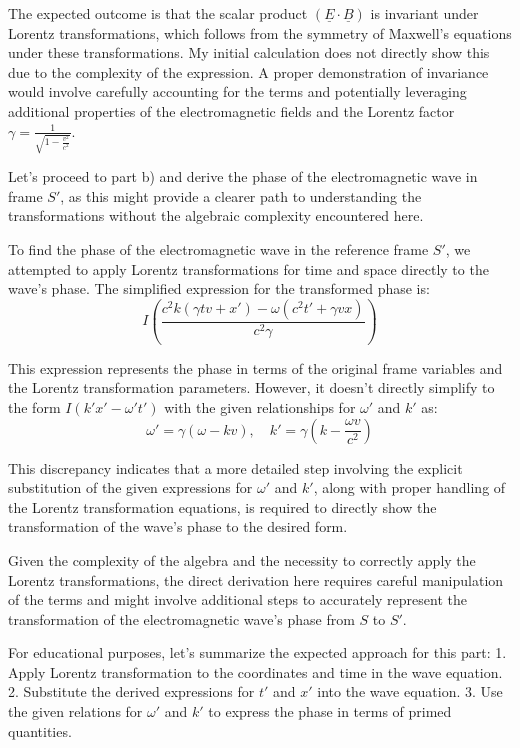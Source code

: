 The expected outcome is that the scalar product \( (\underline{E} \cdot \underline{B}) \) is invariant under Lorentz transformations, which follows from the symmetry of Maxwell's equations under these transformations. My initial calculation does not directly show this due to the complexity of the expression. A proper demonstration of invariance would involve carefully accounting for the terms and potentially leveraging additional properties of the electromagnetic fields and the Lorentz factor \( \gamma = \frac{1}{\sqrt{1 - \frac{v^2}{c^2}}} \).

Let's proceed to part b) and derive the phase of the electromagnetic wave in frame \( S' \), as this might provide a clearer path to understanding the transformations without the algebraic complexity encountered here.

To find the phase of the electromagnetic wave in the reference frame \( S' \), we attempted to apply Lorentz transformations for time and space directly to the wave's phase. The simplified expression for the transformed phase is:
\[ I \left( \frac{c^2 k (\gamma t v + x') - \omega (c^2 t' + \gamma v x)}{c^2 \gamma} \right) \]

This expression represents the phase in terms of the original frame variables and the Lorentz transformation parameters. However, it doesn't directly simplify to the form \( I(k'x' - \omega' t') \) with the given relationships for \(\omega'\) and \(k'\) as:
\[ \omega' = \gamma(\omega - kv), \quad k' = \gamma \left(k - \frac{\omega v}{c^{2}} \right) \]

This discrepancy indicates that a more detailed step involving the explicit substitution of the given expressions for \(\omega'\) and \(k'\), along with proper handling of the Lorentz transformation equations, is required to directly show the transformation of the wave's phase to the desired form.

Given the complexity of the algebra and the necessity to correctly apply the Lorentz transformations, the direct derivation here requires careful manipulation of the terms and might involve additional steps to accurately represent the transformation of the electromagnetic wave's phase from \( S \) to \( S' \).

For educational purposes, let's summarize the expected approach for this part:
1. Apply Lorentz transformation to the coordinates and time in the wave equation.
2. Substitute the derived expressions for \(t'\) and \(x'\) into the wave equation.
3. Use the given relations for \(\omega'\) and \(k'\) to express the phase in terms of primed quantities.

